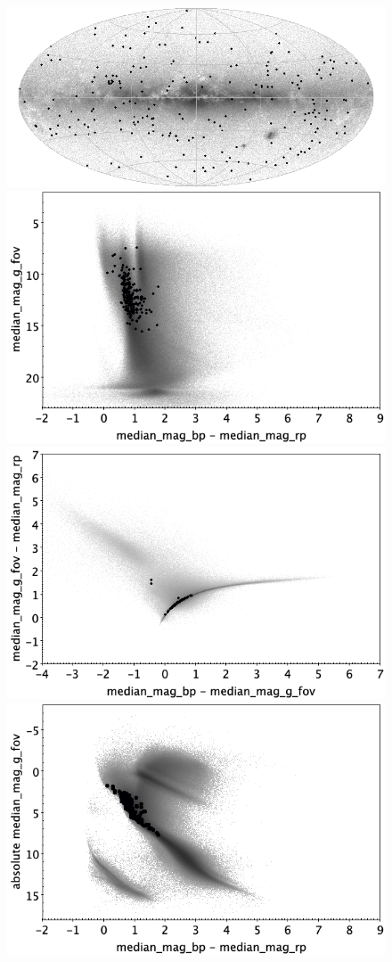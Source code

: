\documentclass[longauth]{aa}
\begin{document}
\begin{appendix}
\begin{figure}
\centering
{}
\includegraphics[width=0.6\hsize]{figures/appendix/EP_cls_sky.png} 
 \\ %
\vspace{4mm}
 \includegraphics[width=0.45\hsize]{figures/appendix/EP_cls_cm.png}  %
\hspace{2mm}
 \includegraphics[width=0.45\hsize]{figures/appendix/EP_cls_cc.png} \\ %
\vspace{4mm}
 \includegraphics[width=0.45\hsize]{figures/appendix/EP_cls_cam.png}  %

\end{figure}
\end{appendix}
\end{document}
